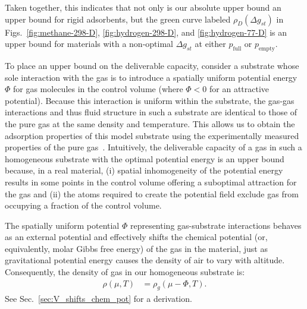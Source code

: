 \documentclass[twoside,twocolumn,9pt]{article}
\newcommand\V{\Phi}
\newcommand\pfull{\ensuremath{p_{\text{full}}}}
\newcommand\pempty{\ensuremath{p_{\text{empty}}}}
\newcommand\gst{\ensuremath{\Delta g_{st}}}
\begin{document}
Taken together, this indicates that not only is our absolute upper bound an
upper bound for rigid adsorbents, but the green curve labeled $\rho_D(\gst)$ in
Figs.~\ref{fig:methane-298-D}, \ref{fig:hydrogen-298-D}, and
\ref{fig:hydrogen-77-D} is an upper bound for materials with a non-optimal
$\gst$ at either $\pfull$ or $\pempty$.


To place an upper bound on the deliverable capacity, consider a substrate whose
sole interaction with the gas is to introduce a spatially uniform potential
energy $\V$ for gas molecules in the control volume (where $\V<0$ for an
attractive potential). Because this interaction is uniform within the
substrate, the gas-gas interactions and thus fluid structure in such a
substrate are identical to those of the pure gas at the same density and
temperature. This allows us to obtain the adsorption properties of this model
substrate using the experimentally measured properties of the pure
gas~\cite{nist}. Intuitively, the deliverable capacity of a gas in such a
homogeneous substrate with the optimal potential energy is an upper bound
because, in a real material, (i) spatial inhomogeneity of the potential
energy results in some points in the control volume offering a suboptimal
attraction for the gas and (ii) the atoms required to create the potential
field exclude gas from occupying a fraction of the control volume.

The spatially uniform potential $\V$ representing gas-substrate interactions
behaves as an external potential and effectively shifts the chemical potential
(or, equivalently, molar Gibbs free energy) of the gas in the material, just as
gravitational potential energy causes the density of air to vary with altitude.
Consequently, the density of gas in our homogeneous substrate is:
\begin{align}
    \rho(\mu,T) &= \rho_g(\mu - \V,T). \label{eq:mof-density}
\end{align}
See Sec.~\ref{sec:V_shifts_chem_pot} for a derivation.
\end{document}
